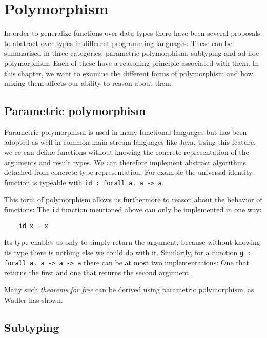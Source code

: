 \chapter{Polymorphism}\label{ch:polymorphism}

In order to generalize functions over data types there have been several proposals to abstract over types in different programming languages:
These can be summarised in three categories: parametric polymorphism, subtyping and ad-hoc polymorphism.
Each of these have a reasoning principle associated with them.
In this chapter, we want to examine the different forms of polymorphism and how mixing them affects our ability to reason about them.

\section{Parametric polymorphism}\label{sec:parmetric-polymorphism}

Parametric polymorphism is used in many functional languages but has been adopted as well in common main stream languages like Java.
Using this feature, we ce can define functions without knowing the concrete representation of the arguments and result types.
We can therefore implement abstract algorithms detached from concrete type representation.
For example the universal identity function is typeable with \texttt{id : forall a. a -> a}.

This form of polymorphism allows us furthermore to reason about the behavior of functions:
The \texttt{id} function mentioned above can only be implemented in one way:

\begin{lstlisting}
    id x = x
\end{lstlisting}

Its type enables us only to simply return the argument, because without knowing its type there is nothing else we could do with it.
Similarily, for a function \texttt{g : forall a. a -> a -> a} there can be at most two implementations:
One that returns the first and one that returns the second argument.

Many such \emph{theorems for free} can be derived using parametric polymorphism, as Wadler has shown. \cite{wadlertheorems}

\section{Subtyping}\label{sec:subtyping}

